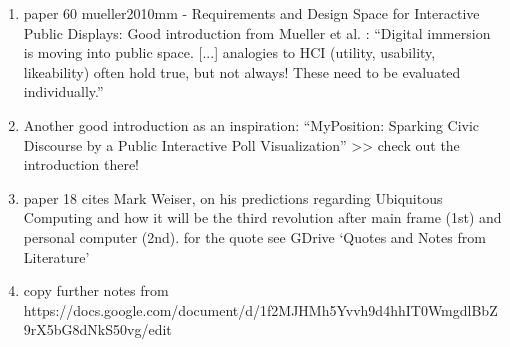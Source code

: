 	\begin{enumerate}
	\item paper 60 mueller2010mm - Requirements and Design Space for  Interactive Public Displays: Good introduction from Mueller et al. \cite{muller2010requirements}: ``Digital immersion is moving into public space. [...] analogies to HCI (utility, usability, likeability) often hold true, but not always! These need to be evaluated individually.''

	\item Another good introduction as an inspiration: ``MyPosition: Sparking Civic Discourse by a Public Interactive Poll Visualization'' >> check out the introduction there! \cite{valkanova2014myposition}

	\item paper 18 cites Mark Weiser, on his predictions regarding Ubiquitous Computing and how it will be the third revolution after main frame (1st) and personal computer (2nd). for the quote see GDrive `Quotes and Notes from Literature'

	\item copy further notes from https://docs.google.com/document/d/1f2MJHMh5Yvvh9d4hhIT0WmgdlBbZ9rX5bG8dNkS50vg/edit
	\end{enumerate}



